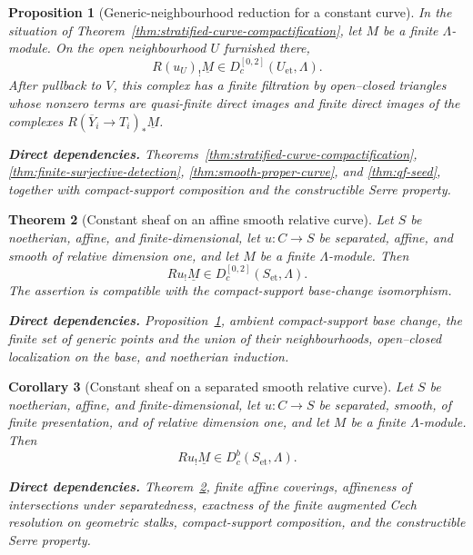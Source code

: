 \documentclass[10pt]{article}
\newtheorem{theorem}{Theorem}[section]
\newtheorem{proposition}[theorem]{Proposition}
\newtheorem{corollary}[theorem]{Corollary}
\theoremstyle{definition}
\newcommand{\deps}[1]{\par\smallskip\noindent\textbf{Direct dependencies.} #1}
\begin{document}
\begin{proposition}[Generic-neighbourhood reduction for a constant curve]
\label{prop:constant-curve-generic}
In the situation of
Theorem~\ref{thm:stratified-curve-compactification}, let $M$ be a finite
$\Lambda$-module.  On the open neighbourhood $U$ furnished there,
\[
 R(u_U)_!\underline M\in D_c^{[0,2]}(U_{\mathrm{et}},\Lambda).
\]
After pullback to $V$, this complex has a finite filtration by open--closed
triangles whose nonzero terms are quasi-finite direct images and finite direct
images of the complexes $R(\overline Y_i\to T_i)_*\underline M$.
\deps{Theorems~\ref{thm:stratified-curve-compactification},
\ref{thm:finite-surjective-detection}, \ref{thm:smooth-proper-curve}, and
\ref{thm:qf-seed}, together with compact-support composition and the
constructible Serre property.}
\end{proposition}

\begin{theorem}[Constant sheaf on an affine smooth relative curve]
\label{thm:relative-curve}
Let $S$ be noetherian, affine, and finite-dimensional, let
$u:C\to S$ be separated, affine, and smooth of relative dimension one, and
let $M$ be a finite $\Lambda$-module.  Then
\[
 Ru_!\underline M\in D_c^{[0,2]}(S_{\mathrm{et}},\Lambda).
\]
The assertion is compatible with the compact-support base-change
isomorphism.
\deps{Proposition~\ref{prop:constant-curve-generic}, ambient compact-support
base change, the finite set of generic points and the union of their
neighbourhoods, open--closed localization on the base, and noetherian
induction.}
\end{theorem}

\begin{corollary}[Constant sheaf on a separated smooth relative curve]
\label{cor:constant-separated-curve}
Let $S$ be noetherian, affine, and finite-dimensional, let $u:C\to S$ be
separated, smooth, of finite presentation, and of relative dimension one,
and let $M$ be a finite $\Lambda$-module.  Then
\[
 Ru_!\underline M\in D_c^b(S_{\mathrm{et}},\Lambda).
\]
\deps{Theorem~\ref{thm:relative-curve}, finite affine coverings, affineness
of intersections under separatedness, exactness of the finite augmented
Cech resolution on geometric stalks, compact-support composition, and the
constructible Serre property.}
\end{corollary}
\end{document}
